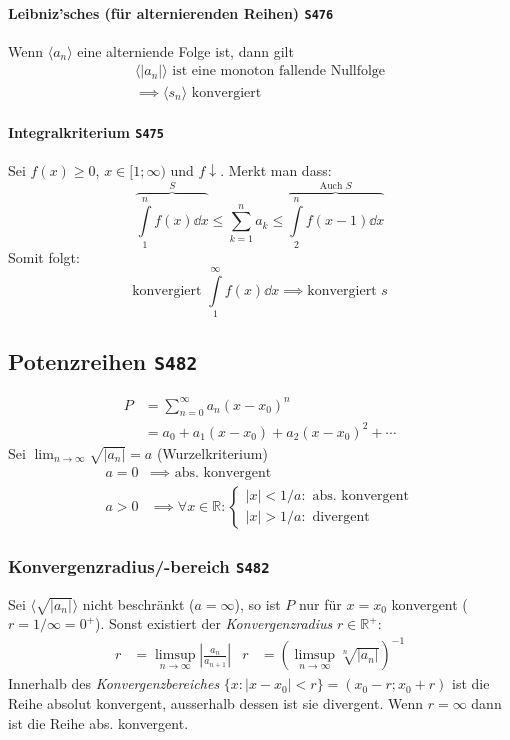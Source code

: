 \documentclass[margin=small, twocolumn]{hsrzf}
\numberwithin{equation}{subsection}
\newcommand{\brpage}[1]{\textcolor{red!70!black}{\small\texttt{S#1}}}
\begin{document}
\paragraph{Leibniz'sches (f\"ur alternierenden Reihen) \brpage{476}}
Wenn \(\langle a_n \rangle\) eine alterniende Folge ist, dann gilt
\begin{gather*}
    \langle |a_n| \rangle \text{ ist eine monoton fallende Nullfolge} \\
    \implies \langle s_n \rangle \text{ konvergiert}
\end{gather*}

\paragraph{Integralkriterium \brpage{475}}
Sei \(f(x) \geq 0\), \(x \in [1;\infty)\) und \(f\downarrow\). Merkt man dass:
\[
    \overbrace{\int\limits_1^n f(x) \dd{x}}^{S} 
    \leq \sum_{k=1}^n a_k
    \leq \overbrace{\int\limits_2^n f(x-1) \dd{x}}^{\text{Auch } S}
\]
Somit folgt:
\[
    \text{konvergiert } \int\limits_1^\infty f(x) \dd{x}
    \implies \text{konvergiert } s
\]

\subsection{Potenzreihen \brpage{482}} \label{sec:powerseries}
\begin{align*}
    P &= \sum_{n=0}^\infty a_n (x - x_0)^n \\
      &= a_0 + a_1 (x - x_0) + a_2 (x - x_0)^2 + \cdots
\end{align*}
Sei \(\lim_{n\to\infty} \sqrt{|a_n|} = a \) (Wurzelkriterium)
\begin{align*}
    a = 0 &\implies \text{ abs. konvergent} \\
    a > 0 &\implies
    \forall x \in \mathbb{R}:
    \begin{cases}
        |x| < 1/a: \text{ abs. konvergent} \\
        |x| > 1/a: \text{ divergent}
    \end{cases}
\end{align*}

\subsubsection{Konvergenzradius/-bereich \brpage{482}}
Sei \(\langle \sqrt{|a_n|}\rangle\) nicht beschr\"ankt (\(a = \infty\)), so ist \(P\) nur f\"ur \(x=x_0\) konvergent (\(r = 1/\infty = 0^+\)). Sonst existiert der \emph{Konvergenzradius} \(r \in\mathbb{R}^+\):
\begin{align*}
    r &= \limsup_{n\to\infty} \left| \frac{a_n}{a_{n+1}} \right| &
    r &= \left( \limsup_{n\to\infty} \sqrt[n]{| a_n |} \right)^{-1}
\end{align*}
Innerhalb des \emph{Konvergenzbereiches} \(\{ x : |x - x_0| < r\} = (x_0-r; x_0+r)\) ist die Reihe absolut konvergent, ausserhalb dessen ist sie divergent.
Wenn \(r = \infty\) dann ist die Reihe abs. konvergent.
\end{document}

